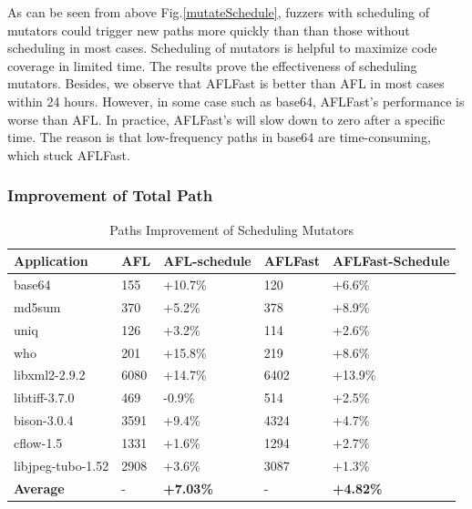 As can be seen from above Fig.\ref{mutateSchedule}, fuzzers with scheduling of mutators could trigger new paths more quickly than than those without scheduling in most cases. Scheduling of mutators is helpful to maximize code coverage in limited time. The results prove the effectiveness of scheduling mutators. Besides, we observe that AFLFast is better than AFL in most cases within 24 hours. However, in some case such as base64, AFLFast's performance is worse than AFL. In practice, AFLFast's will slow down to zero after a specific time. The reason is that low-frequency paths in base64 are time-consuming, which stuck AFLFast.

\subsubsection{Improvement of Total Path}

\begin{table}[t]
\centering
\begin{adjustbox}{max width=\columnwidth}
\begin{tabular}{|l|l|l|l|l|}
\hline
\textbf{Application }      & \textbf{AFL} & \textbf{AFL-schedule} & \textbf{AFLFast} & \textbf{AFLFast-Schedule} \\\hline
base64            &   155 &  +10.7\%     &    120     &    +6.6\%              \\ \hline
md5sum          &   370 &    +5.2\%    &      378   &      +8.9\%            \\ \hline
uniq                 &  126   &   +3.2\%     &   114      &     +2.6\%              \\ \hline
who                  &  201   &  +15.8\%      &   219      &    +8.6\%            \\ \hline
libxml2-2.9.2   & 6080   &   +14.7\%      &  6402       & +13.9\%        \\ \hline
libtiff-3.7.0       &  469   &   -0.9\%     &      514   &       +2.5\%          \\ \hline
bison-3.0.4       &  3591   &      +9.4\%        &   4324      &   +4.7\%      \\ \hline
cflow-1.5           & 1331    &   +1.6\%     &   1294      &  +2.7\%               \\ \hline
libjpeg-tubo-1.52 & 2908    &    +3.6\%    &   3087      &   +1.3\%         \\ \hline
\textbf{Average}               &   -  &   \textbf{+7.03\%}    &    -      &     \textbf{+4.82\% }                \\ \hline
\end{tabular}
\end{adjustbox}
\caption{Paths Improvement of Scheduling Mutators}
\label{EffectiveOfMutatorDistribution}
\end{table}


